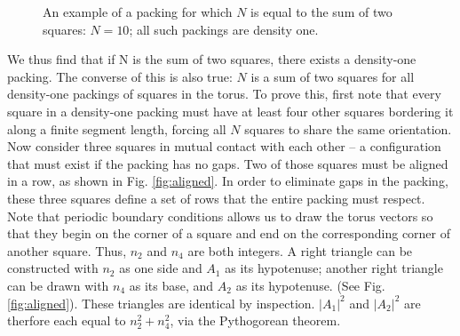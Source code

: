 \documentclass[preprint,aps]{revtex4}
\begin{document}
\begin{figure}[H]
\caption{\label{fig:bravais} An example of a packing for which $N$ is equal to the sum of two squares: $N=10$; all such packings are density one.}
\end{figure}

We thus find that if N is the sum of two squares, there exists a density-one packing. The converse of this is also true: $N$ is a sum of two squares for all density-one packings of squares in the torus. To prove this, first note that every square in a density-one packing must have at least four other squares bordering it along a finite segment length, forcing all $N$ squares to share the same orientation.  Now consider three squares in mutual contact with each other -- a configuration that must exist if the packing has no gaps. Two of those squares must be aligned in a row, as shown in Fig. \ref{fig:aligned}. In order to eliminate gaps in the packing, these three squares define a set of rows that the entire packing must respect. Note that periodic boundary conditions allows us to draw the torus vectors so that they begin on the corner of a square and end on the corresponding corner of another square.  Thus, $n_2$ and $n_4$ are both integers. A right triangle can be constructed with $n_2$ as one side and $A_1$ as its hypotenuse; another right triangle can be drawn with $n_4$ as its base, and $A_2$ as its hypotenuse. (See Fig. \ref{fig:aligned}). These triangles are identical by inspection.  $|A_1|^2$ and $|A_2|^2$ are therfore each equal to $n_2^2 + n_4^2$, via the Pythogorean theorem.
\end{document}
